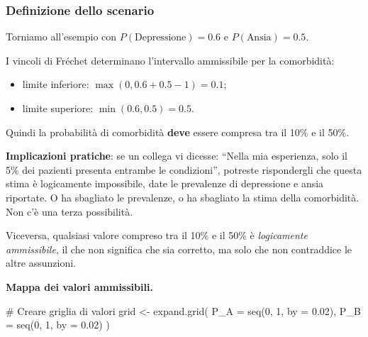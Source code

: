 \documentclass[
  italian,
  letterpaper,
  a4paper,
  11pt,
  open=any]{scrbook}
\newenvironment{Shaded}{\begin{snugshade}}{\end{snugshade}}
\newcommand{\AttributeTok}[1]{\textcolor[rgb]{0.40,0.45,0.13}{#1}}
\newcommand{\CommentTok}[1]{\textcolor[rgb]{0.37,0.37,0.37}{#1}}
\newcommand{\DecValTok}[1]{\textcolor[rgb]{0.68,0.00,0.00}{#1}}
\newcommand{\FloatTok}[1]{\textcolor[rgb]{0.68,0.00,0.00}{#1}}
\newcommand{\FunctionTok}[1]{\textcolor[rgb]{0.28,0.35,0.67}{#1}}
\newcommand{\NormalTok}[1]{\textcolor[rgb]{0.00,0.23,0.31}{#1}}
\newcommand{\OtherTok}[1]{\textcolor[rgb]{0.00,0.23,0.31}{#1}}
\providecommand{\tightlist}{%
  \setlength{\itemsep}{0pt}\setlength{\parskip}{0pt}}
\theoremstyle{plain}
\theoremstyle{definition}
\theoremstyle{definition}
\theoremstyle{remark}
\begin{document}
\begin{tcolorbox}[enhanced jigsaw, arc=.35mm, bottomrule=.15mm, bottomtitle=1mm, breakable, colback=white, colbacktitle=quarto-callout-note-color!10!white, colframe=quarto-callout-note-color-frame, coltitle=black, left=2mm, leftrule=.75mm, opacityback=0, opacitybacktitle=0.6, rightrule=.15mm, title=\textcolor{quarto-callout-note-color}{\faInfo}\hspace{0.5em}{Applicazione alla comorbidità psicologica}, titlerule=0mm, toprule=.15mm, toptitle=1mm]

\subsubsection*{Definizione dello
scenario}\label{definizione-dello-scenario}

Torniamo all'esempio con \(P(\text{Depressione}) = 0.6\) e
\(P(\text{Ansia}) = 0.5\).

I vincoli di Fréchet determinano l'intervallo ammissibile per la
comorbidità:

\begin{itemize}
\tightlist
\item
  limite inferiore: \(\max(0, 0.6 + 0.5 - 1) = 0.1\);
\item
  limite superiore: \(\min(0.6, 0.5) = 0.5\).
\end{itemize}

Quindi la probabilità di comorbidità \textbf{deve} essere compresa tra
il 10\% e il 50\%.

\textbf{Implicazioni pratiche}: se un collega vi dicesse: ``Nella mia
esperienza, solo il 5\% dei pazienti presenta entrambe le condizioni'',
potreste rispondergli che questa stima è logicamente impossibile, date
le prevalenze di depressione e ansia riportate. O ha sbagliato le
prevalenze, o ha sbagliato la stima della comorbidità. Non c'è una terza
possibilità.

Viceversa, qualsiasi valore compreso tra il 10\% e il 50\% è
\emph{logicamente ammissibile}, il che non significa che sia corretto,
ma solo che non contraddice le altre assunzioni.

\textbf{Mappa dei valori ammissibili.}

\begin{Shaded}
\begin{Highlighting}[]
\CommentTok{\# Creare griglia di valori}
\NormalTok{grid }\OtherTok{\textless{}{-}} \FunctionTok{expand.grid}\NormalTok{(}
  \AttributeTok{P\_A =} \FunctionTok{seq}\NormalTok{(}\DecValTok{0}\NormalTok{, }\DecValTok{1}\NormalTok{, }\AttributeTok{by =} \FloatTok{0.02}\NormalTok{),}
  \AttributeTok{P\_B =} \FunctionTok{seq}\NormalTok{(}\DecValTok{0}\NormalTok{, }\DecValTok{1}\NormalTok{, }\AttributeTok{by =} \FloatTok{0.02}\NormalTok{)}
\NormalTok{)}


\end{Highlighting}
\end{Shaded}
\end{tcolorbox}
\end{document}
